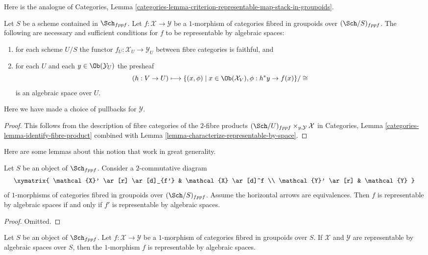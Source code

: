 \medskip\noindent
Here is the analogue of Categories,
Lemma \ref{categories-lemma-criterion-representable-map-stack-in-groupoids}.

\begin{lemma}
\label{lemma-criterion-map-representable-spaces-fibred-in-groupoids}
Let $S$ be a scheme contained in $\Sch_{fppf}$.
Let $f : \mathcal{X} \to \mathcal{Y}$ be a $1$-morphism
of categories fibred in groupoids over $(\Sch/S)_{fppf}$.
The following are necessary and sufficient conditions for
$f$ to be representable by algebraic spaces:
\begin{enumerate}
\item for each scheme $U/S$ the
functor $f_U : \mathcal{X}_U \longrightarrow \mathcal{Y}_U$
between fibre categories is faithful, and
\item for each $U$ and each $y \in \Ob(\mathcal{Y}_U)$ the presheaf
$$
(h : V \to U)
\longmapsto
\{(x, \phi) \mid x \in \Ob(\mathcal{X}_V), \phi : h^*y \to f(x)\}/\cong
$$
is an algebraic space over $U$.
\end{enumerate}
Here we have made a choice of pullbacks for $\mathcal{Y}$.
\end{lemma}

\begin{proof}
This follows from the description of fibre categories of the $2$-fibre products
$(\Sch/U)_{fppf} \times_{y, \mathcal{Y}} \mathcal{X}$ in
Categories, Lemma \ref{categories-lemma-identify-fibre-product}
combined with
Lemma \ref{lemma-characterize-representable-by-space}.
\end{proof}

\noindent
Here are some lemmas about this notion that work in great generality.

\begin{lemma}
\label{lemma-representable-by-spaces-morphism-equivalent}
Let $S$ be an object of $\Sch_{fppf}$.
Consider a $2$-commutative diagram
$$
\xymatrix{
\mathcal{X}' \ar[r] \ar[d]_{f'} & \mathcal{X} \ar[d]^f \\
\mathcal{Y}' \ar[r] & \mathcal{Y}
}
$$
of $1$-morphisms of categories fibred in groupoids over
$(\Sch/S)_{fppf}$.
Assume the horizontal arrows are equivalences.
Then $f$ is representable by algebraic spaces
if and only if $f'$ is representable by algebraic spaces.
\end{lemma}

\begin{proof}
Omitted.
\end{proof}

\begin{lemma}
\label{lemma-morphism-spaces-gives-representable-by-spaces}
Let $S$ be an object of $\Sch_{fppf}$.
Let $f : \mathcal{X} \to \mathcal{Y}$
be a $1$-morphism of categories fibred in groupoids over $S$.
If $\mathcal{X}$ and $\mathcal{Y}$ are representable by
algebraic spaces over $S$, then the $1$-morphism $f$
is representable by algebraic spaces.
\end{lemma}

